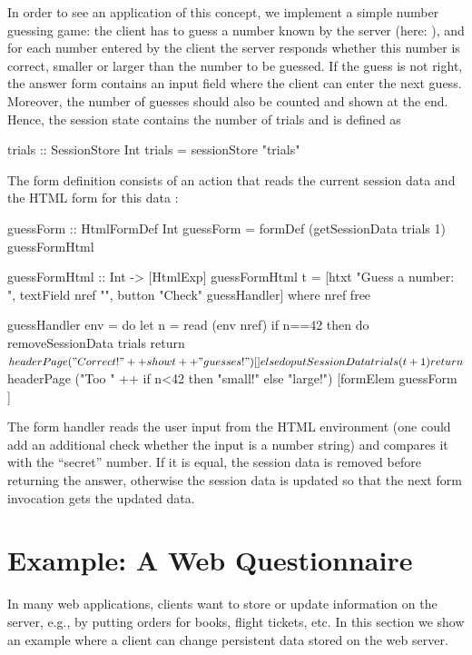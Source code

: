 In order to see an application of this concept,
we implement a simple number guessing game:
the client has to guess a number
known by the server (here: ), and for each number entered
by the client the server responds whether this number
is correct, smaller or larger than the number to be guessed.
If the guess is not right, the answer form contains an input
field where the client can enter the next guess.
Moreover, the number of guesses should also be counted
and shown at the end.
Hence, the session state contains the number of trials
and is defined as
%
\begin{curry}
trials :: SessionStore Int
trials = sessionStore "trials"
\end{curry}
%
The form definition consists of an action that reads the current
session data and the HTML form for this data :
%
\begin{curry}
guessForm :: HtmlFormDef Int
guessForm = formDef (getSessionData trials 1) guessFormHtml

guessFormHtml :: Int -> [HtmlExp]
guessFormHtml t =
  [htxt "Guess a number: ", textField nref "",
   button "Check" guessHandler]
 where
  nref free

  guessHandler env = do
    let n = read (env nref)
    if n==42
      then do
        removeSessionData trials
        return $ headerPage ("Correct! " ++ show t ++ " guesses!") []
      else do
        putSessionData trials (t+1)
        return $ headerPage ("Too " ++ if n<42 then "small!" else "large!")
               [formElem guessForm ]
\end{curry} %
%
The form handler reads the user input from the HTML environment
(one could add an additional check whether the input is a number string)
and compares it with the ``secret'' number.
If it is equal, the session data is removed before returning the answer,
otherwise the session data is updated
so that the next form invocation gets the updated data.


\section{Example: A Web Questionnaire}

In many web applications, clients want to store
or update information on the server, e.g., by putting orders
for books, flight tickets, etc.
In this section we show an example where a client
can change persistent data stored on the web server.


